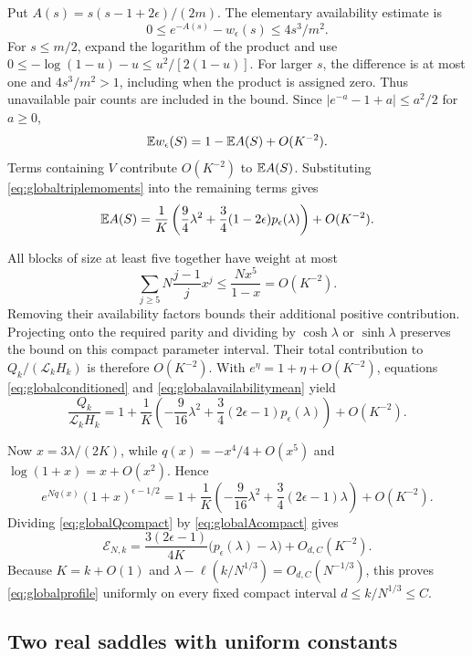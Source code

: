 Put $A(s)=s(s-1+2\epsilon)/(2m)$. The elementary availability estimate is
\[
0\le e^{-A(s)}-w_\epsilon(s)\le4s^3/m^2.
\]
For $s\le m/2$, expand the logarithm of the product and use
$0\le-\log(1-u)-u\le u^2/[2(1-u)]$. For larger $s$, the difference is at most one and $4s^3/m^2>1$, including when the product is assigned zero. Thus unavailable pair counts are included in the bound. Since $|e^{-a}-1+a|\le a^2/2$ for $a\ge0$,
\[
\mathbb E w_\epsilon(S)=1-\mathbb E A(S)+O(K^{-2}).
\]
Terms containing $V$ contribute $O(K^{-2})$ to $\mathbb E A(S)$. Substituting \eqref{eq:globaltriplemoments} into the remaining terms gives
\begin{equation}\label{eq:globalavailabilitymean}
\mathbb E A(S)=\frac1K\left(\frac94\lambda^2
+\frac34(1-2\epsilon)p_\epsilon(\lambda)\right)+O(K^{-2}).
\end{equation}

All blocks of size at least five together have weight at most
\[
\sum_{j\ge5}N\frac{j-1}{j}x^j
\le\frac{Nx^5}{1-x}=O(K^{-2}).
\]
Removing their availability factors bounds their additional positive contribution. Projecting onto the required parity and dividing by $\cosh\lambda$ or $\sinh\lambda$ preserves the bound on this compact parameter interval. Their total contribution to $Q_k/(\mathcal L_kH_k)$ is therefore $O(K^{-2})$. With $e^\eta=1+\eta+O(K^{-2})$, equations \eqref{eq:globalconditioned} and \eqref{eq:globalavailabilitymean} yield
\begin{equation}\label{eq:globalQcompact}
\frac{Q_k}{\mathcal L_kH_k}
=1+\frac1K\left(-\frac9{16}\lambda^2
+\frac34(2\epsilon-1)p_\epsilon(\lambda)\right)+O(K^{-2}).
\end{equation}

Now $x=3\lambda/(2K)$, while $q(x)=-x^4/4+O(x^5)$ and $\log(1+x)=x+O(x^2)$. Hence
\begin{equation}\label{eq:globalAcompact}
e^{Nq(x)}(1+x)^{\epsilon-1/2}
=1+\frac1K\left(-\frac9{16}\lambda^2
+\frac34(2\epsilon-1)\lambda\right)+O(K^{-2}).
\end{equation}
Dividing \eqref{eq:globalQcompact} by \eqref{eq:globalAcompact} gives
\begin{equation}\label{eq:globalcompact}
\mathcal E_{N,k}
=\frac{3(2\epsilon-1)}{4K}
\bigl(p_\epsilon(\lambda)-\lambda\bigr)+O_{d,C}(K^{-2}).
\end{equation}
Because $K=k+O(1)$ and $\lambda-\ell(k/N^{1/3})=O_{d,C}(N^{-1/3})$, this proves \eqref{eq:globalprofile} uniformly on every fixed compact interval $d\le k/N^{1/3}\le C$.

\subsection{Two real saddles with uniform constants}

